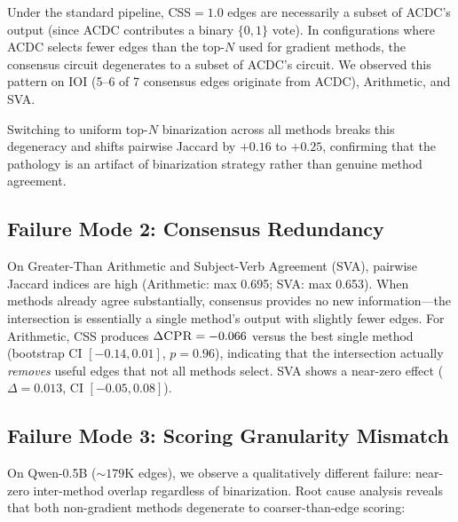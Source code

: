 \documentclass[11pt,a4paper]{article}
\newcommand{\css}{\textsc{CSS}}
\newcommand{\cpr}{\textsc{CPR}}
\begin{document}
Under the standard pipeline, \css{}$=1.0$ edges are necessarily a subset of ACDC's output (since ACDC contributes a binary $\{0,1\}$ vote). In configurations where ACDC selects fewer edges than the top-$N$ used for gradient methods, the consensus circuit degenerates to a subset of ACDC's circuit. We observed this pattern on IOI (5--6 of 7 consensus edges originate from ACDC), Arithmetic, and SVA.

Switching to uniform top-$N$ binarization across all methods breaks this degeneracy and shifts pairwise Jaccard by $+0.16$ to $+0.25$, confirming that the pathology is an artifact of binarization strategy rather than genuine method agreement.

\subsection{Failure Mode 2: Consensus Redundancy}
\label{sec:redundancy}

On Greater-Than Arithmetic and Subject-Verb Agreement (SVA), pairwise Jaccard indices are high (Arithmetic: max 0.695; SVA: max 0.653). When methods already agree substantially, consensus provides no new information---the intersection is essentially a single method's output with slightly fewer edges. For Arithmetic, \css{} produces $\Delta\cpr{}=-0.066$ versus the best single method (bootstrap CI $[-0.14, 0.01]$, $p=0.96$), indicating that the intersection actually \emph{removes} useful edges that not all methods select. SVA shows a near-zero effect ($\Delta=0.013$, CI $[-0.05, 0.08]$).

\subsection{Failure Mode 3: Scoring Granularity Mismatch}
\label{sec:granularity}

On Qwen-0.5B (${\sim}179$K edges), we observe a qualitatively different failure: near-zero inter-method overlap regardless of binarization. Root cause analysis reveals that both non-gradient methods degenerate to coarser-than-edge scoring:
\end{document}
